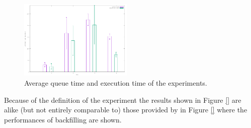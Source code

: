 \begin{figure}[!htb]
        \includegraphics[width=0.48\textwidth]{./figures/draft/AvgT.pdf}
    \caption{Average queue time and execution time of the experiments.}
\label{fig:avtTimes}
\end{figure}

Because of the definition of the experiment the results shown in Figure \ref{} are alike (but not entirely comparable to) those provided by in Figure \ref{} where the performances of backfilling are shown. 


 






%
%
